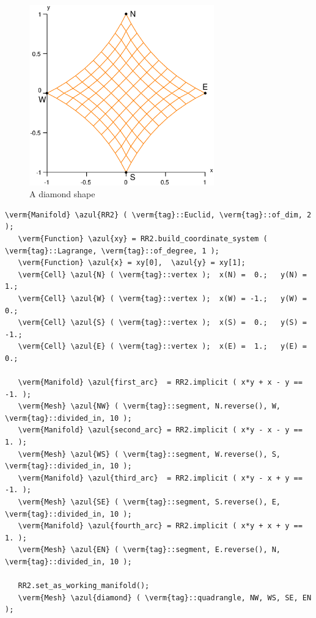 \begin{figure}[ht] \centering
  \includegraphics[width=80mm]{diamond}
  \caption{A diamond shape}
  \label{\numb section 2.\numb fig 10}
\end{figure}

\begin{Verbatim}[commandchars=\\\{\},formatcom=\small\tt,frame=single,
   label=parag-\ref{\numb section 2.\numb parag 10}.cpp,rulecolor=\color{coment},
   baselinestretch=0.94,framesep=2mm]
   \verm{Manifold} \azul{RR2} ( \verm{tag}::Euclid, \verm{tag}::of_dim, 2 );
   \verm{Function} \azul{xy} = RR2.build_coordinate_system ( \verm{tag}::Lagrange, \verm{tag}::of_degree, 1 );
   \verm{Function} \azul{x} = xy[0],  \azul{y} = xy[1];
   \verm{Cell} \azul{N} ( \verm{tag}::vertex );  x(N) =  0.;   y(N) =  1.;
   \verm{Cell} \azul{W} ( \verm{tag}::vertex );  x(W) = -1.;   y(W) =  0.;
   \verm{Cell} \azul{S} ( \verm{tag}::vertex );  x(S) =  0.;   y(S) = -1.;
   \verm{Cell} \azul{E} ( \verm{tag}::vertex );  x(E) =  1.;   y(E) =  0.;

   \verm{Manifold} \azul{first_arc}  = RR2.implicit ( x*y + x - y == -1. );
   \verm{Mesh} \azul{NW} ( \verm{tag}::segment, N.reverse(), W, \verm{tag}::divided_in, 10 );
   \verm{Manifold} \azul{second_arc} = RR2.implicit ( x*y - x - y ==  1. );
   \verm{Mesh} \azul{WS} ( \verm{tag}::segment, W.reverse(), S, \verm{tag}::divided_in, 10 );
   \verm{Manifold} \azul{third_arc}  = RR2.implicit ( x*y - x + y == -1. );
   \verm{Mesh} \azul{SE} ( \verm{tag}::segment, S.reverse(), E, \verm{tag}::divided_in, 10 );
   \verm{Manifold} \azul{fourth_arc} = RR2.implicit ( x*y + x + y ==  1. );
   \verm{Mesh} \azul{EN} ( \verm{tag}::segment, E.reverse(), N, \verm{tag}::divided_in, 10 );
   
   RR2.set_as_working_manifold();
   \verm{Mesh} \azul{diamond} ( \verm{tag}::quadrangle, NW, WS, SE, EN );
\end{Verbatim}

